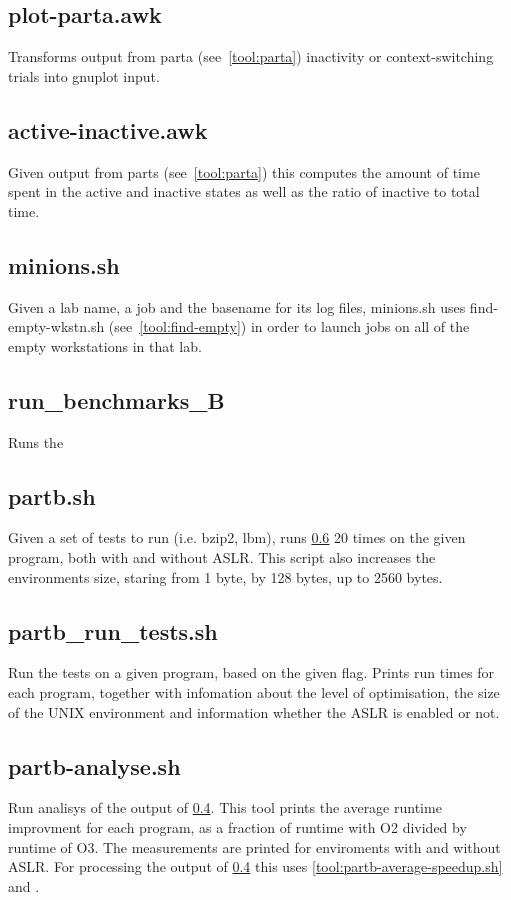 \documentclass{article}
\begin{document}
\subsection{plot-parta.awk}
Transforms output from parta (see~\ref{tool:parta}) inactivity or 
context-switching trials into gnuplot input.

\subsection{active-inactive.awk} \label{tool:active-inactive}
Given output	 from parts (see~\ref{tool:parta}) this computes the amount of time
spent in the active and inactive states as well as the ratio of inactive to
total time.

\subsection{minions.sh} \label{tool:minions}
Given a lab name, a job and the basename for its log files, minions.sh
uses find-empty-wkstn.sh (see~\ref{tool:find-empty}) in order to launch jobs on
all of the empty workstations in that lab.

\subsection{run_benchmarks_B} \label{tool:run_benchmark_B}
Runs the 

\subsection{partb.sh}
Given a set of tests to run (i.e. bzip2, lbm), runs \ref{tool:partb_run_tests.sh} 20 times on the given program, both with and without ASLR. This script also increases the environments size, staring from 1 byte, by 128 bytes, up to 2560 bytes.

\subsection{partb_run_tests.sh} \label{tool:partb_run_tests.sh}
Run the tests on a given program, based on the given flag. Prints run times for each program, together with infomation about the level of optimisation, the size of the UNIX environment and information whether the ASLR is enabled or not.

\subsection{partb-analyse.sh}
Run analisys of the output of \ref{tool:run_benchmark_B}. This tool prints the average runtime improvment for each program, as a fraction of runtime with O2 divided by runtime of O3. The measurements are printed for enviroments with and without ASLR. For processing the output of \ref{tool:run_benchmark_B} this uses \ref{tool:partb-average-speedup.sh} and \label{tool:partb-average-speedup-aslr.sh}.
\end{document}
